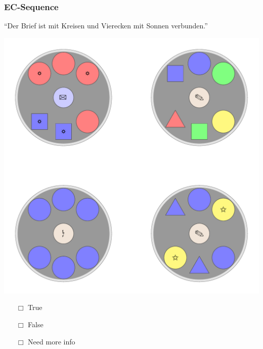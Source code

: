 \documentclass[fleqn,10pt,xcolor=dvipsnames]{beamer}
\newcommand{\EC}{EC\xspace}
\newcommand{\mymark}[1]{{\color{mycol}{#1}}}
\begin{document}
\begin{frame}
  \frametitle{\EC-Sequence}
  \begin{center}
    ``Der Brief ist mit Kreisen und Vierecken mit Sonnen verbunden.''

    \vspace{0.1cm}

    \includegraphics[width=0.5 \textwidth]{../../pictures/ec_01_1.pdf}

    \vspace{0.1cm}

    \begin{multicols}{3}
      \begin{itemize} 
      \item[$\Box$] True\\
        \onslide<2>{$\leadsto$  \mymark{false}}
      \item[$\Box$] False\\
        \onslide<2>{$\leadsto$ \mymark{false}}
      \item[$\Box$] Need more info 
      \end{itemize}
    \end{multicols}

  \end{center}
\end{frame}
\end{document}
